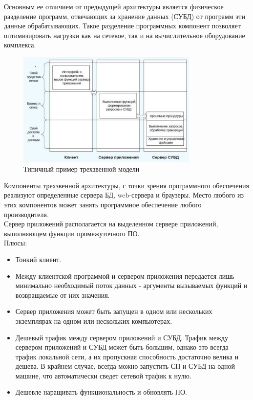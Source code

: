 Основным ее отличием от предыдущей архитектуры является физическое разделение
программ, отвечающих за хранение данных (СУБД) от программ эти данные
обрабатывающих. Такое разделение программных компонент позволяет оптимизировать
нагрузки как на сетевое, так и на вычислительное оборудование комплекса.~\\

\begin{figure}[h!]
    \centering
    \includegraphics[width=0.8\textwidth]{assets/665}
    \caption{Типичный пример трехзвенной модели}
\end{figure}

Компоненты трехзвенной архитектуры, с точки зрения программного обеспечения
реализуют определенные сервера БД, web-сервера и браузеры. Место любого из этих
компонентов может занять программное обеспечение любого производителя.~\\

Сервер приложений располагается на выделенном сервере приложений, выполняющем функции промежуточного ПО.~\\

Плюсы:
\begin{itemize}
    \item Тонкий клиент.
    \item Между клиентской программой и сервером приложения передается лишь минимально необходимый поток данных - аргументы вызываемых функций и возвращаемые от них значения.
    \item Сервер приложения может быть запущен в одном или нескольких экземплярах на одном или нескольких компьютерах.
    \item Дешевый трафик между сервером приложений и СУБД. Трафик между сервером приложений и СУБД может быть большим, однако это всегда трафик локальной сети, а их пропускная способность достаточно велика и дешева. В крайнем случае, всегда можно запустить СП и СУБД на одной машине, что автоматически сведет сетевой трафик к нулю.
    \item Дешевле наращивать функциональность и обновлять ПО.
\end{itemize}

